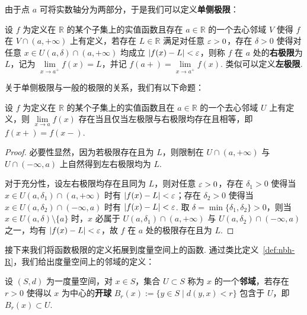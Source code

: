 \documentclass[../main.tex]{subfiles}
\begin{document}
由于点 $a$ 可将实数轴分为两部分，于是我们可以定义\textbf{单侧极限}：

\begin{definition}[单侧极限的定义] \label{def:lim-func-oneside}
    设 $f$ 为定义在 $\mathbb R$ 的某个子集上的实值函数且存在 $a \in \mathbb R$ 的一个去心邻域 $V$ 使得 $f$ 在 $V \cap (a, +\infty)$ 上有定义，若存在 $L \in \mathbb R$ 满足对任意 $\varepsilon > 0$，存在 $\delta > 0$ 使得对任意 $x \in U(a, \delta) \cap (a, +\infty)$ 均成立 $|f(x) - L| < \varepsilon$，则称 $f$ 在 $a$ 处的\textbf{右极限}为 $L$，记为 $\lim\limits_{x \to a^+} f(x) = L$，并记 $f(a+) = \lim\limits_{x \to a^+} f(x)$. 类似可以定义\textbf{左极限}. 
\end{definition}

关于单侧极限与一般的极限的关系，我们有以下命题：

\begin{proposition}[单侧极限与极限的关系]
    \label{prop:relation-one-side-lim}
    设 $f$ 为定义在 $\mathbb R$ 的某个子集上的实值函数且在 $a \in \mathbb R$ 的一个去心邻域 $U$ 上有定义，则 $\lim\limits_{x \to a} f(x)$ 存在当且仅当左极限与右极限均存在且相等，即 $f(x+) = f(x-)$. 
\end{proposition}

\begin{proof}
    必要性显然，因为若极限存在且为 $L$，则限制在 $U \cap (a, +\infty)$ 与 $U \cap (-\infty, a)$ 上自然得到左右极限均为 $L$. 
    
    对于充分性，设左右极限均存在且同为 $L$，则对任意 $\varepsilon > 0$，存在 $\delta_1 > 0$ 使得当 $x \in U(a, \delta_1) \cap (a, +\infty)$ 时有 $|f(x) - L| < \varepsilon$；存在 $\delta_2 > 0$ 使得当 $x \in U(a, \delta_2) \cap (-\infty, a)$ 时有 $|f(x) - L| < \varepsilon$. 取 $\delta = \min\{\delta_1, \delta_2\} > 0$，则当 $x \in U(a, \delta) \setminus \{a\}$ 时，$x$ 必属于 $U(a, \delta_1) \cap(a, +\infty)$ 与 $U(a, \delta_2) \cap (-\infty, a)$ 之一，均有 $|f(x) - L| < \varepsilon$，故 $f$ 在 $a$ 处的极限存在且为 $L$. 
\end{proof}


接下来我们将函数极限的定义拓展到度量空间上的函数. 通过类比定义~\ref{def:nbh-R}，我们给出度量空间上的邻域的定义：
\begin{definition}[度量空间上的邻域的定义] \label{def:nbh-ms}
    设 $(S, d)$ 为一度量空间，对 $x \in S$，集合 $U \subset S$ 称为 $x$ 的一个\textbf{邻域}，若存在 $r > 0$ 使得以 $x$ 为中心的\textbf{开球} $B_r(x) := \{y \in S \mid d(y, x) < r\}$ 包含于 $U$，即 $B_r(x) \subset U$. 
\end{definition}
\end{document}

